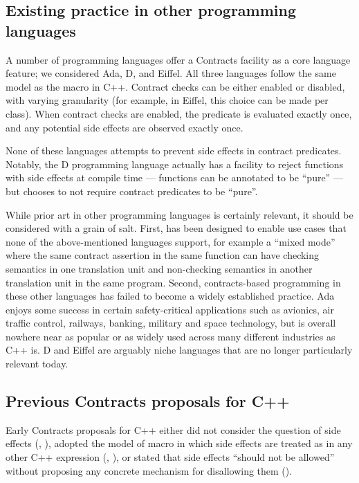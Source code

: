 \subsection{Existing practice in other programming languages}

A number of programming languages offer a Contracts facility as a core language feature; we considered Ada, D, and Eiffel. All three languages follow the same model as the  macro in C++. Contract checks can be either enabled or disabled, with varying granularity (for example, in Eiffel, this choice can be made per class). When contract checks are enabled, the predicate is evaluated exactly once, and any potential side effects are observed exactly once. 

None of these languages attempts to prevent side effects in contract predicates. Notably, the D programming language actually has a facility to reject functions with side effects at compile time --- functions can be annotated to be ``pure'' --- but chooses to not require contract predicates to be ``pure''. 

While prior art in other programming languages is certainly relevant, it should be considered with a grain of salt. First, \cite{P2900R6} has been designed to enable use cases that none of the above-mentioned languages support, for example a ``mixed mode'' where the same contract assertion in the same function can have checking semantics in one translation unit and non-checking semantics in another translation unit in the same program. Second, contracts-based programming in these other languages has failed to become a widely established practice. Ada enjoys some success in certain safety-critical applications such as avionics, air traffic control, railways, banking, military and space technology, but is overall nowhere near as popular or as widely used across many different industries as C++ is. D and Eiffel are arguably niche languages that are no longer particularly relevant today.

\subsection{Previous Contracts proposals for C++}

Early Contracts proposals for C++ either did not consider the question of side effects (\cite{N1613}, \cite{N1669}), adopted the model of macro  in which side effects are treated as in any other C++ expression (\cite{N3604}, \cite{N4378}), or stated that side effects ``should not be allowed'' without proposing any concrete mechanism for disallowing them (\cite{N4110}).

